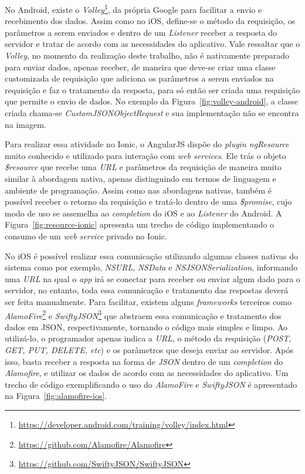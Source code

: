 No Android, existe o \textit{Volley}\footnote{\url{https://developer.android.com/training/volley/index.html}}, da própria Google para facilitar a envio e recebimento dos dados. Assim como no iOS, define-se o método da 
requisição, os parâmetros a serem enviados e dentro de um \textit{Listener} receber a resposta do servidor e tratar de acordo com as necessidades do aplicativo. Vale ressaltar que o \textit{Volley}, no momento da realização
deste trabalho, não é nativamente preparado para enviar dados, apenas receber, de maneira que deve-se criar uma classe customizada de requisição que adiciona os parâmetros a serem enviados na requisição e faz o tratamento da
resposta, para só então ser criada uma requisição que permite o envio de dados. No exemplo da Figura~\ref{fig:volley-android}, a classe criada chama-se \textit{CustomJSONObjectRequest} e sua implementação não se encontra 
na imagem.

Para realizar essa atividade no Ionic, o AngularJS dispõe do \textit{plugin ngResource} muito conhecido e utilizado para interação com \textit{web services}. Ele trás o objeto \textit{\$resource} que recebe uma 
\textit{URL} e parâmetros da requisição de maneira muito similar à abordagem nativa, apenas distinguindo em termos de linguagem e ambiente de programação. Assim como nas abordagens nativas, também é possível receber 
o retorno da requisição e tratá-lo dentro de uma \textit{\$promise}, cujo modo de uso se assemelha ao \textit{completion} do iOS e ao \textit{Listener} do Android. A Figura~\ref{fig:resource-ionic} apresenta um trecho 
de código implementando o consumo de um \textit{web service} privado no Ionic.

No iOS é possível realizar essa comunicação utilizando algumas classes nativas do sistema como por exemplo, \textit{NSURL}, \textit{NSData} e \textit{NSJSONSerialization}, informando uma \textit{URL} 
na qual o \textit{app} irá se conectar para receber ou enviar algum dado para o servidor, no entanto, toda essa comunicação e tratamento das respostas deverá ser feita manualmente. Para facilitar, existem alguns 
\textit{frameworks} terceiros como \textit{AlamoFire}\footnote{\url{https://github.com/Alamofire/Alamofire}} e \textit{SwiftyJSON}\footnote{\url{https://github.com/SwiftyJSON/SwiftyJSON}} 
que abstraem essa comunicação e tratamento dos dados em JSON, respectivamente, tornando o código mais simples e limpo. Ao utilizá-lo, o programador apenas indica a \textit{URL}, o método da requisição 
(\textit{POST, GET, PUT, DELETE, etc}) e os parâmetros que deseja enviar ao servidor. Após isso, basta receber a resposta na forma de \textit{JSON} dentro de um \textit{completion} do \textit{Alamofire}, 
e utilizar os dados de acordo com as necessidades do aplicativo. Um trecho de código exemplificando o uso do \textit{AlamoFire} e \textit{SwiftyJSON} é apresentado na Figura~\ref{fig:alamofire-ios}.

